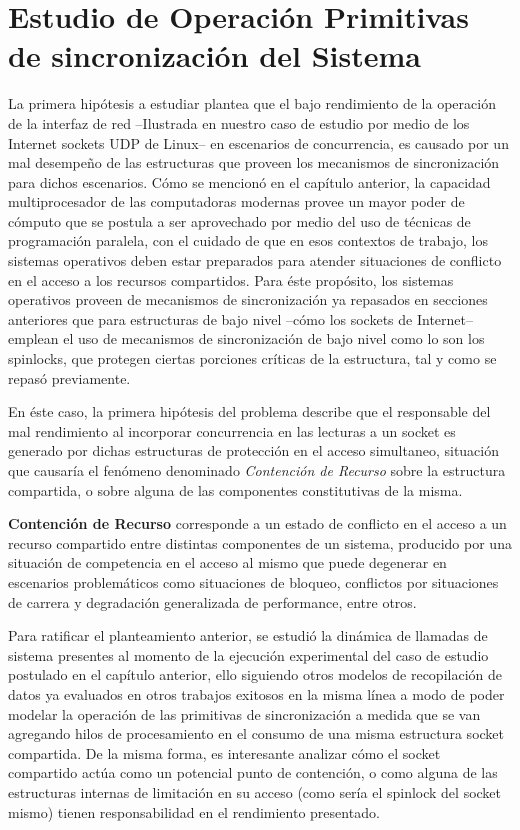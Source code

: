 \chapter{Estudio de Operación Primitivas de sincronización del Sistema}

La primera hipótesis a estudiar plantea que el bajo rendimiento de la operación de la interfaz de red --Ilustrada en nuestro caso de estudio por medio de los Internet sockets UDP de Linux-- en escenarios de concurrencia, es causado por un mal desempeño de las estructuras que proveen los mecanismos de sincronización para dichos escenarios. Cómo se mencionó en el capítulo anterior, la capacidad multiprocesador de las computadoras modernas provee un mayor poder de cómputo que se postula a ser aprovechado por medio del uso de técnicas de programación paralela, con el cuidado de que en esos contextos de trabajo, los sistemas operativos deben estar preparados para atender situaciones de conflicto en el acceso a los recursos compartidos. Para éste propósito, los sistemas operativos proveen de mecanismos de sincronización ya repasados en secciones anteriores que para estructuras de bajo nivel --cómo los sockets de Internet-- emplean el uso de mecanismos de sincronización de bajo nivel como lo son los spinlocks, que protegen ciertas porciones críticas de la estructura, tal y como se repasó previamente.

En éste caso, la primera hipótesis del problema describe que el responsable del mal rendimiento al incorporar concurrencia en las lecturas a un socket es generado por dichas estructuras de protección en el acceso simultaneo, situación que causaría el fenómeno denominado \emph{Contención de Recurso} sobre la estructura compartida, o sobre alguna de las componentes constitutivas de la misma.

\begin{defn} \textbf{Contención de Recurso} corresponde a un estado de conflicto en el acceso a un recurso compartido entre distintas componentes de un sistema, producido por una situación de competencia en el acceso al mismo que puede degenerar en escenarios problemáticos como situaciones de bloqueo, conflictos por situaciones de carrera y degradación generalizada de performance, entre otros.
\end{defn}

Para ratificar el planteamiento anterior, se estudió la dinámica de llamadas de sistema presentes al momento de la ejecución experimental del caso de estudio postulado en el capítulo anterior, ello siguiendo otros modelos de recopilación de datos ya evaluados en otros trabajos exitosos en la misma línea \cite{slides:hpPerf} a modo de poder modelar la operación de las primitivas de sincronización a medida que se van agregando hilos de procesamiento en el consumo de una misma estructura socket compartida. De la misma forma, es interesante analizar cómo el socket compartido actúa como un potencial punto de contención, o como alguna de las estructuras internas de limitación en su acceso (como sería el spinlock del socket mismo) tienen responsabilidad en el rendimiento presentado.

